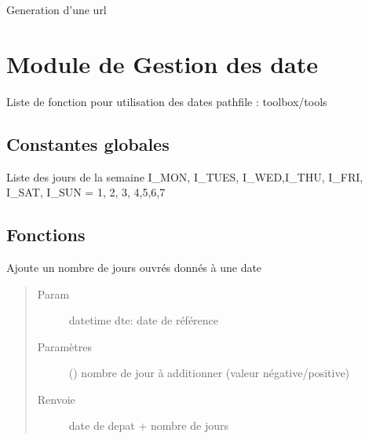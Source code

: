 \documentclass[letterpaper,10pt,french]{sphinxmanual}
\begin{document}

\begin{fulllineitems}
\label{\detokenize{modules/tools:toolbox.features.url_join}}
Generation d’une url

\end{fulllineitems}

\label{\detokenize{modules/dtemng:module-toolbox.dtemng}}

\chapter{Module de Gestion des date}
\label{\detokenize{modules/dtemng:module-de-gestion-des-date}}\label{\detokenize{modules/dtemng::doc}}
Liste de fonction pour utilisation des dates
pathfile : toolbox/tools


\section{Constantes globales}
\label{\detokenize{modules/dtemng:constantes-globales}}
Liste des jours de la semaine
I\_MON, I\_TUES, I\_WED,I\_THU, I\_FRI, I\_SAT, I\_SUN = 1, 2, 3, 4,5,6,7


\section{Fonctions}
\label{\detokenize{modules/dtemng:fonctions}}

\begin{fulllineitems}
\label{\detokenize{modules/dtemng:toolbox.dtemng.date_add_workday}}
Ajoute un nombre de jours ouvrés donnés à une date
\begin{quote}\begin{description}
\item[{Param}] \leavevmode
datetime dte: date de référence

\item[{Paramètres}] \leavevmode
{} () \textendash{} nombre de jour à additionner (valeur négative/positive)

\item[{Renvoie}] \leavevmode
date de depat + nombre de jours

\end{description}\end{quote}

\end{fulllineitems}
\end{document}
